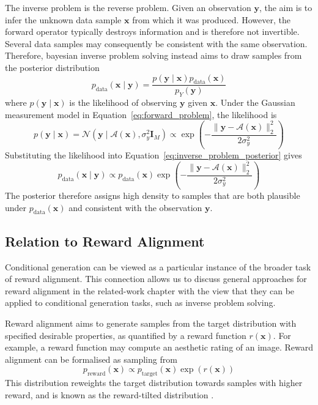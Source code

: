 \documentclass[12pt,a4paper]{report}
\begin{document}
The inverse problem is the reverse problem. Given an observation $\mathbf{y}$, the aim is to infer the unknown data sample $\mathbf{x}$ from which it was produced. However, the forward operator typically destroys information and is therefore not invertible. Several data samples may consequently be consistent with the same observation. Therefore, bayesian inverse problem solving instead aims to draw samples from the posterior distribution
\begin{equation}
p_{\mathrm{data}}(\mathbf{x}\mid\mathbf{y})
=
\frac{
p(\mathbf{y}\mid\mathbf{x})
p_{\mathrm{data}}(\mathbf{x})
}{
p_Y(\mathbf{y})
}
\label{eq:inverse_problem_posterior}
\end{equation}
where $p(\mathbf{y}\mid\mathbf{x})$ is the likelihood of observing $\mathbf{y}$ given $\mathbf{x}$. Under the Gaussian measurement model in Equation~\ref{eq:forward_problem}, the likelihood is
\begin{equation}
p(\mathbf{y}\mid\mathbf{x})
=
\mathcal{N}\left(
\mathbf{y}
\mid
\mathcal{A}(\mathbf{x}),
\sigma_y^2\mathbf{I}_{M}
\right)
\propto
\exp\left(
-\frac{
\lVert\mathbf{y}-\mathcal{A}(\mathbf{x})\rVert_2^2
}{
2\sigma_y^2
}
\right)
\label{eq:inverse_problem_likelihood}
\end{equation}
Substituting the likelihood into Equation~\ref{eq:inverse_problem_posterior} gives
\begin{equation}
p_{\mathrm{data}}(\mathbf{x}\mid\mathbf{y})
\propto
p_{\mathrm{data}}(\mathbf{x})
\exp\left(
-\frac{
\lVert\mathbf{y}-\mathcal{A}(\mathbf{x})\rVert_2^2
}{
2\sigma_y^2
}
\right)
\label{eq:inverse_problem_posterior_gaussian}
\end{equation}
The posterior therefore assigns high density to samples that are both plausible under $p_{\mathrm{data}}(\mathbf{x})$ and consistent with the observation $\mathbf{y}$.

\subsection{Relation to Reward Alignment}
\label{subsec:relation_to_reward_alignment}
Conditional generation can be viewed as a particular instance of the broader task of reward alignment. This connection allows us to discuss general approaches for reward alignment in the related-work chapter with the view that they can be applied to conditional generation tasks, such as inverse problem solving.

Reward alignment aims to generate samples from the target distribution with specified desirable properties, as quantified by a reward function $r(\mathbf{x})$. For example, a reward function may compute an aesthetic rating of an image. Reward alignment can be formalised as sampling from 
\begin{equation}
p_{\mathrm{reward}}(\mathbf{x})
\propto
p_{\mathrm{target}}(\mathbf{x})
\exp\left(r(\mathbf{x})\right)
\label{eq:reward_tilted_distribution}
\end{equation}
This distribution reweights the target distribution towards samples with higher reward, and is known as the reward-tilted distribution \parencite{huang2026guideflowfewstepalignment,MFM,Diamond_maps}.
\end{document}
